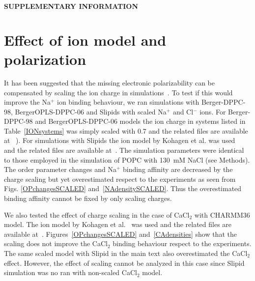 \documentclass[pre,aps,floatfix,authordate1-4,twocolumn]{revtex4-1}
\begin{document}
\newpage

\appendix
\begin{center}
{\bf SUPPLEMENTARY INFORMATION}
\end{center}

\section{Effect of ion model and polarization}
It has been suggested that the missing electronic polarizability 
can be compensated by scaling the ion charge in simulations~\cite{leontyev11}. 
To test if this would improve the Na$^+$ ion binding behaviour, we ran simulations with Berger-DPPC-98, BergerOPLS-DPPC-06
and Slipids with scaled Na$^+$ and Cl$^-$ ions. For Berger-DPPC-98 and BergerOPLS-DPPC-06 models 
the ion charge in systems listed in Table~\ref{IONsystems} was simply scaled with 0.7 and
the related files are available 
at ~\cite{DPPCBergerNaCl150mMscaled,DPPCBergerNaCl1000mMscaled,DPPCBergerOPLS06NaCl150mMscaled,DPPCBergerOPLS06NaCl1000mMscaled}). 
For simulations with Slipids the ion model by Kohagen et al. was used~\cite{kohagen15} and the related files are 
available at~\cite{slipidsFILESpopcSCALED}. The simulation parameters were identical to those employed in the simulation of POPC with 130~mM NaCl (see Methods).
The order parameter changes and Na$^+$ binding affinity are decreased by the charge scaling but 
yet overestimated respect to the experiments as seen from Figs. \ref{OPchangesSCALED} and~\ref{NAdensitySCALED}. 
Thus the overestimated binding affinity cannot be fixed by only scaling charges.

We also tested the effect of charge scaling in the case of CaCl$_2$ with CHARMM36 model.
The ion model by Kohagen et al.~\cite{kohagen14} was used  and the related files are 
available at~\cite{charmmFILESpopc450mMcaclSCALED}. Figures~\ref{OPchangesSCALED} and~\ref{CAdensities}
show that the scaling does not improve the CaCl$_2$ binding behaviour respect to the
experiments. The same scaled model with Slipid in the main text also
overestimated the CaCl$_2$ effect. However, the effect of scaling cannot be analyzed in this case since
Slipid simulation was no ran with non-scaled CaCl$_2$ model.



\end{document}
